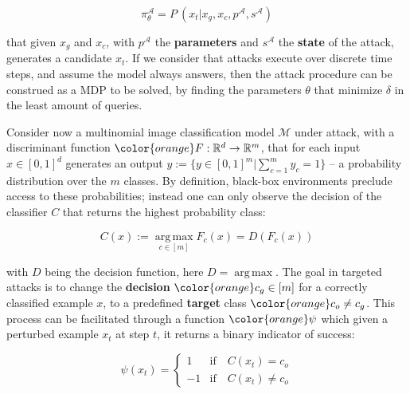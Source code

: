 \begin{equation}
    \pi_\theta^{\mathcal{A}} = P\: (x_{t}|x_g, x_{c}, p^{\mathcal{A}}, s^{\mathcal{A}})
\label{eqn:genpolicy}
\end{equation}

\noindent that given $x_g$ and $x_{c}$, with $p^{\mathcal{A}}$ the \textbf{parameters} and $s^{\mathcal{A}}$ the \textbf{state} of the attack, generates a candidate $x_t$.
If we consider that attacks execute over discrete time steps, and assume the model always answers, then the attack procedure can be construed as a \gls{MDP} to be solved, by finding the parameters $\theta$ that minimize $\delta$ in the least amount of queries.

Consider now a multinomial image classification model $\mathcal{M}$ under attack, with a discriminant function $\color{orange}F: \mathbb{R}^d \rightarrow \mathbb{R}^m$, that for each input $x \in [0,1]^d$ generates an output $y := \{y \in [0,1]^m |\sum_{c=1}^{m}y_c = 1\}$ -- a probability distribution over the $m$ classes.
By definition, black-box environments preclude access to these probabilities; instead one can only observe the decision of the classifier $C$ that returns the highest probability class:

\begin{equation}
    C(x) := \operatorname*{arg\,max}_{c \in [m]} F_c(x) = D(F_c(x))
\label{eqn:classifier} 
\end{equation}

\noindent with $D$ being the decision function, here $D = \operatorname*{arg\,max}$.
The goal in targeted attacks is to change the \textbf{decision} $\color{orange}c_g \in [m]$ for a correctly classified example $x$, to a predefined \textbf{target} class $\color{orange}c_o \neq c_g$.
This process can be facilitated through a function $\color{orange}\psi$ which given a perturbed example $x_t$ at step $t$, it returns a binary indicator of success:

\begin{equation}
    \psi(x_t) = \begin{cases}
                    1 & \text{if}\quad C(x_t) = c_o\\
                    -1 & \text{if}\quad C(x_t) \neq c_o
                \end{cases}
\label{eqn:psi}
\end{equation}

